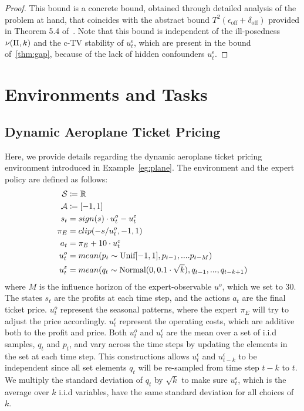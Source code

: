 \begin{proof}
This bound is a concrete bound, obtained through detailed analysis of the problem at hand, that coincides with the abstract bound $T^2(\epsilon_{\text{off}}+\delta_{\text{off}})$ provided in Theorem 5.4 of~\citet{Swamy2022_temporal}. Note that this bound is independent of the ill-posedness $\nu(\Pi,k)$ and the c-TV stability of $u^\epsilon_t$, which are present in the bound of~\cref{thm:gap}, because of the lack of hidden confounders $u^\epsilon_t$.
\end{proof}


\section{Environments and Tasks}
\subsection{Dynamic Aeroplane Ticket Pricing}\label{appendix:ticket}
Here, we provide details regarding the dynamic aeroplane ticket pricing environment introduced in Example~\ref{eg:plane}. The environment and the expert policy are defined as follows:
\begin{align}
\mathcal{S}&\coloneqq\mathbb{R}\\
\mathcal{A}&\coloneqq[-1,1]\\
s_t&=sign(s)\cdot u^o_t - u^\varepsilon_t\\
\pi_E&=clip(-s/u^o_t,-1,1)\\
a_t&=\pi_E+10\cdot u^\varepsilon_t\\
u^o_t&=mean(p_t\sim \text{Unif} [-1,1],p_{t-1},....p_{t-M})\\
u^\varepsilon_t&=mean(q_t\sim \text{Normal}(0,0.1\cdot\sqrt{k}),q_{t-1},...,q_{t-k+1})
\end{align}
where $M$ is the influence horizon of the expert-observable $u^o$, which we set to 30. The states $s_t$ are the profits at each time step, and the actions $a_t$ are the final ticket price. $u^o_t$ represent the seasonal patterns, where the expert $\pi_E$ will try to adjust the price accordingly. $u^\epsilon_t$ represent the operating costs, which are additive both to the profit and price. Both $u^o_t$ and $u^\epsilon_t$ are the mean over a set of i.i.d samples, $q_t$ and $p_t$, and vary across the time steps by updating the elements in the set at each time step. This constructions allows $u^\epsilon_t$ and $u^\epsilon_{t-k}$ to be independent since all set elements $q_t$ will be re-sampled from time step $t-k$ to $t$. We multiply the standard deviation of $q_t$ by $\sqrt{k}$ to make sure $u^\epsilon_t$, which is the average over $k$ i.i.d variables, have the same standard deviation for all choices of $k$.

